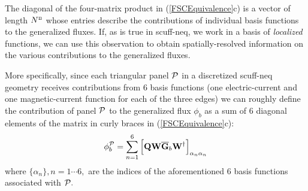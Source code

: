 \documentclass[letterpaper]{article}
\begin{document}
The diagonal of the four-matrix product in (\ref{FSCEquivalence}c) 
is a vector of length $N^{\hbox{\tiny{B}}}$ whose entries describe the 
contributions of individual basis functions to the generalized
fluxes. If, as is true in {\sc scuff-neq}, we work in a basis
of \textit{localized} functions, we can use this observation 
to obtain spatially-resolved information on the various 
contributions to the generalized fluxes.

More specifically, since each triangular panel $\mathcal{P}$ 
in a discretized {\sc scuff-neq} geometry receives contributions 
from 6 basis functions (one electric-current and one magnetic-current
function for each of the three edges) we can roughly define the
contribution of panel $\mathcal{P}$ to the generalized flux $\phi_b$ 
as a sum of 6 diagonal elements of the matrix in curly braces
in (\ref{FSCEquivalence}c):
$$ \phi_{b}^{\mathcal{P}} 
   = 
   \sum_{n=1}^6
   \Big[\mathbf{Q} \mathbf{W} \overline{\mathbf{G}}_b \mathbf{W}^\dagger\Big]_{\alpha_n \alpha_n}
$$
where $\{\alpha_n\}, n=1\cdots 6,$ are the indices of the
aforementioned 6 basis functions associated with $\mathcal{P}.$

\newpage


\end{document}
